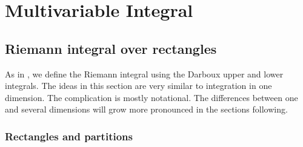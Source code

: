 \chapter{Multivariable Integral} \label{mi:chapter}



\section{Riemann integral over rectangles}
\label{sec:rirect}


As in , we define the Riemann integral using the Darboux
upper and lower integrals.  The ideas in this section are very similar to
integration in one dimension.  The complication is mostly notational.
The differences between one and several dimensions will grow more pronounced
in the sections following.

\subsection{Rectangles and partitions}

